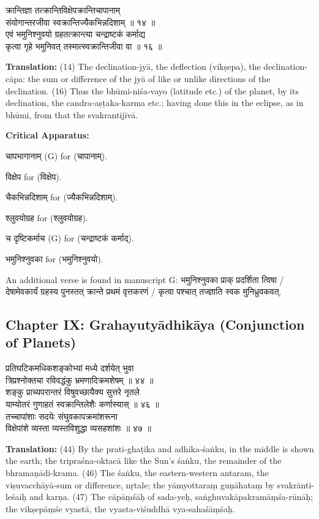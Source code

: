\documentclass[11pt,a4paper]{article}
\newcommand{\dev}[1]{{\devanagarifont #1}}
\newcommand{\sanskritcol}[1]{%
  \begin{minipage}[t]{0.47\textwidth}
  \vspace{0pt}
  \begin{flushleft}
  #1
  \end{flushleft}
  \end{minipage}%
  \hfill
}
\newcommand{\englishcol}[1]{%
  \begin{minipage}[t]{0.47\textwidth}
  \vspace{0pt}
  \begin{flushleft}
  #1
  \end{flushleft}
  \end{minipage}%
}
\newenvironment{variants}{%
  \small%
  \color{varecolor}%
  \list{}{\leftmargin=2em\itemindent=-1em}%
}{\endlist}
\begin{document}
\noindent
\sanskritcol{\dev{क्रान्तिज्ञा तत्क्रान्तिविक्षेपक्रान्तिचापानाम्} \\ \dev{संयोगान्तरजीवा स्वक्रान्तिज्यैकभिन्नदिशाम् ॥ १४ ॥} \\[0.2cm]
\dev{एवं भमुनिश्नुवयो ग्रहतत्क्रान्त्या चन्द्राष्टकं कर्माद्य} \\ \dev{कृत्वा गृहे भमुनिवत् तस्मात्स्वक्रान्तिजीवा वा ॥ १६ ॥}}
\englishcol{\textbf{Translation:} (14) The declination-jyā, the deflection (vikṣepa), the
declination-cāpa: the sum or difference of the jyā of like or unlike directions
of the declination. (16) Thus the bhūmi-niśa-vayo (latitude etc.) of the planet,
by its declination, the candra-aṣṭaka-karma etc.; having done this in the eclipse,
as in bhūmi, from that the svakrantijīvā.}

\vspace{0.4cm}
\textcolor{varecolor}{\textbf{Critical Apparatus:}}
\begin{variants}
\item[14.1] \dev{चापभागानाम्} (G) \dev{for} (\dev{चापानाम्}).
\item[14.2] \dev{विक्षेप} \dev{for} (\dev{विक्षेप}).
\item[14.3] \dev{चैकभिन्नदिशाम्} \dev{for} (\dev{ज्यैकभिन्नदिशाम्}).
\item[16.1] \dev{श्लुवयोग्रह} \dev{for} (\dev{श्लुवयोग्रह}).
\item[16.2] \dev{च दृष्टिकर्माच} (G) \dev{for} (\dev{चन्द्राष्टकं कर्माद्}).
\item[16.3] \dev{भमुनिश्नुवका} \dev{for} (\dev{भमुनिश्नुवयो}).
\item[\dev{वि०}] An additional verse is found in manuscript G:
\dev{भमुनिश्नुवका प्राक् प्रदर्शिता त्विषा} /
\dev{देषामेवकार्यं ग्रहस्य पुनस्तत् क्रान्ते प्रथमं वृत्तकरणं} /
\dev{कृत्वा पश्चात् तज्ज्ञाति स्वक मुनिध्रुवकवत्}.
\end{variants}

\subsection*{Chapter IX: Grahayutyādhikāya (Conjunction of Planets)}

\noindent
\sanskritcol{\dev{प्रतिघटिकमधिकशङ्कोभ्यां मध्ये दर्शयेत् भुवा} \\ \dev{त्रिप्रश्नोक्तचा रविवद्धंकु भ्रमणादिक्रमशेषम् ॥ ४४ ॥} \\[0.2cm]
\dev{शङ्कु प्राच्यपरान्तरं विषुवच्छायैक्य सुत्तरे नृतले} \\ \dev{याम्योतरं गुणाहतं स्वक्रान्तिलेशैः कर्णास्यास् ॥ ४६ ॥} \\[0.2cm]
\dev{तच्चापांशाः सदयेः संघुवकापक्रमांशरूना} \\ \dev{विक्षेपांशे व्यस्ता व्यस्तविशुद्धा व्यसहशांशः ॥ ४७ ॥}}
\englishcol{\textbf{Translation:} (44) By the prati-ghaṭika and adhika-śaṅku, in the middle
is shown the earth; the tripraśna-oktacā like the Sun's śaṅku, the remainder of
the bhramaṇādi-krama. (46) The śaṅku, the eastern-western antaram, the viṣuvacchāyā-sum
or difference, nṛtale; the yāmyottaraṃ guṇāhataṃ by svakrānti-leśaiḥ and karṇa.
(47) The cāpāṃśāḥ of sada-yeḥ, saṅghuvakāpakramāṃśa-rūnāḥ; the vikṣepāṃśe vyastā,
the vyasta-viśuddhā vya-sahaśāṃśaḥ.}
\end{document}
